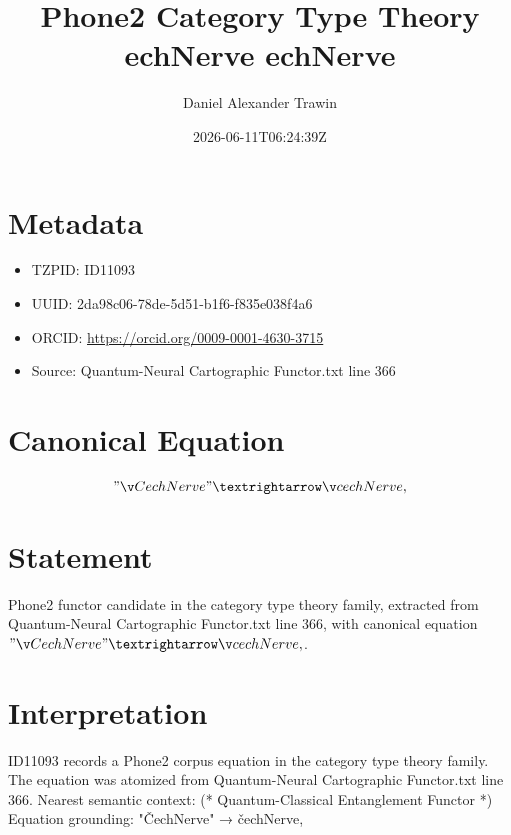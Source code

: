 \documentclass[11pt]{article}
\title{Phone2 Category Type Theory echNerve echNerve}
\author{Daniel Alexander Trawin}
\date{2026-06-11T06:24:39Z}
\begin{document}
\maketitle
\section*{Metadata}
\begin{itemize}
\item TZPID: ID11093
\item UUID: 2da98c06-78de-5d51-b1f6-f835e038f4a6
\item ORCID: \url{https://orcid.org/0009-0001-4630-3715}
\item Source: Quantum-Neural Cartographic Functor.txt line 366
\end{itemize}
\section*{Canonical Equation}
\[
"ČechNerve" → čechNerve,
\]
\section*{Statement}
Phone2 functor candidate in the category type theory family, extracted from Quantum-Neural Cartographic Functor.txt line 366, with canonical equation $"ČechNerve" → čechNerve,$.
\section*{Interpretation}
ID11093 records a Phone2 corpus equation in the category type theory family. The equation was atomized from Quantum-Neural Cartographic Functor.txt line 366. Nearest semantic context: (* Quantum-Classical Entanglement Functor *) Equation grounding: "ČechNerve" → čechNerve,
\end{document}
